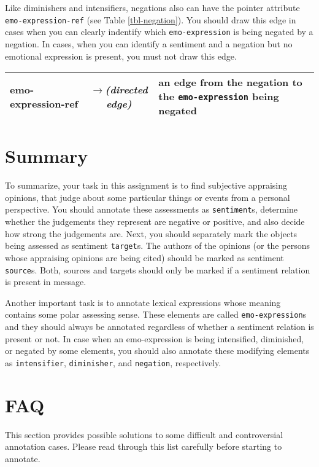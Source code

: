 \documentclass[11pt,a4paper]{article}
\newlength\clmnwidth
\begin{document}
Like diminishers and intensifiers, negations also can have the pointer
attribute \texttt{emo-expression-ref} (see Table \ref{tbl-negation}).
You should draw this edge in cases when you can clearly indentify
which \texttt{emo-expression} is being negated by a negation.  In
cases, when you can identify a sentiment and a negation but no
emotional expression is present, you must not draw this edge.
\begin{center}
  \begin{tabular}{|l|c|p{\clmnwidth}|}\hline\label{tbl-negation}
    emo-expression-ref & \textit{$\longrightarrow$\newline(directed
      edge)} & an edge from the negation to the
    \texttt{emo-expression} being negated\\\hline
  \end{tabular}
\end{center}

\section{Summary}\label{sec:summary}
To summarize, your task in this assignment is to find subjective
appraising opinions, that judge about some particular things or events
from a personal perspective.  You should annotate these assessments as
\texttt{sentiment}s, determine whether the judgements they represent
are negative or positive, and also decide how strong the judgements
are.  Next, you should separately mark the objects being assessed as
sentiment \texttt{target}s.  The authors of the opinions (or the
persons whose appraising opinions are being cited) should be marked as
sentiment \texttt{source}s.  Both, sources and targets should only be
marked if a sentiment relation is present in message.

Another important task is to annotate lexical expressions whose
meaning contains some polar assessing sense.  These elements are
called \texttt{emo-expression}s and they should always be annotated
regardless of whether a sentiment relation is present or not.  In case
when an emo-expression is being intensified, diminished, or negated by
some elements, you should also annotate these modifying elements as
\texttt{intensifier}, \texttt{diminisher}, and \texttt{negation},
respectively.

\section{FAQ}\label{sec:faq}
This section provides possible solutions to some difficult and
controversial annotation cases.  Please read through this list
carefully before starting to annotate.
\end{document}
